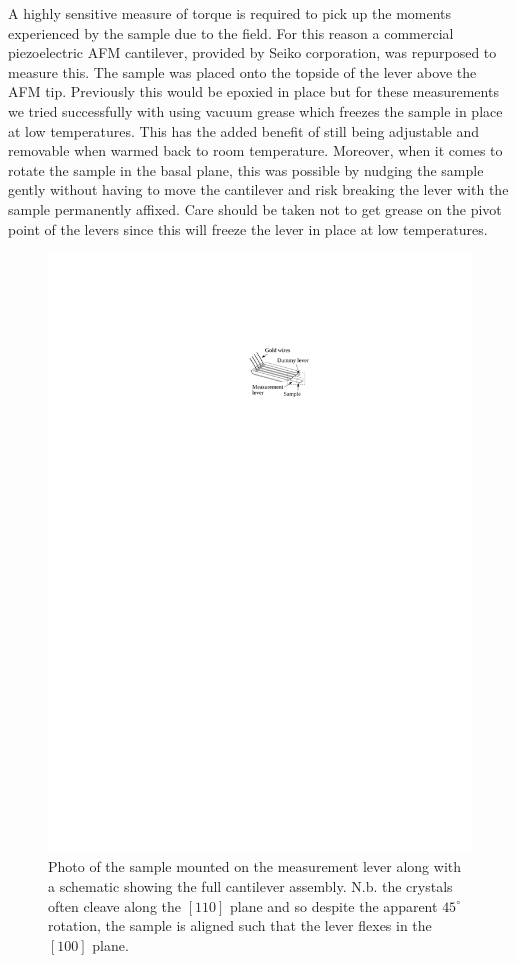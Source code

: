 A highly sensitive measure of torque is required to pick up the moments experienced by the sample due to the field. For this reason a commercial piezoelectric \ac{AFM} cantilever, provided by Seiko corporation, was repurposed to measure this. The sample was placed onto the topside of the lever above the \ac{AFM} tip. Previously this would be epoxied in place but for these measurements we tried successfully with using vacuum grease which freezes the sample in place at low temperatures. This has the added benefit of still being adjustable and removable when warmed back to room temperature. Moreover, when it comes to rotate the sample in the basal plane, this was possible by nudging the sample gently without having to move the cantilever and risk breaking the lever with the sample permanently affixed. Care should be taken not to get grease on the pivot point of the levers since this will freeze the lever in place at low temperatures.
\begin{figure}[htbp]
    \begin{center}
        \includegraphics[scale=1.1]{Chapter-ExperimentalTechnique/Figures/CantileverSchematic/CantileverSchematic}
        \caption{Photo of the \BaFeP{} sample mounted on the measurement lever along with a schematic showing the full cantilever assembly. N.b. the \BaFeP{} crystals often cleave along the $[110]$ plane and so despite the apparent $45^\circ$ rotation, the sample is aligned such that the lever flexes in the $[100]$ plane.}
        \label{Fig:Exp:CantileverSchematic}
    \end{center}
\end{figure}
